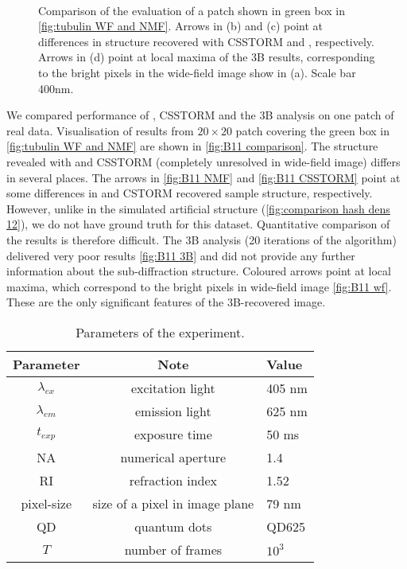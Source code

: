 \begin{figure}[!h]
	\centering
	\newcommand{\sizef}{.95}
	\newcommand{\wf}{.45\textwidth}
	\\
	\caption{Comparison of the evaluation of a patch shown in green box in \autoref{fig:tubulin WF and NMF}. Arrows in (b) and (c) point at differences in structure recovered with CSSTORM and \inmf{}, respectively. Arrows in (d) point at local maxima of the 3B results, corresponding to the bright pixels in the wide-field image show in (a). Scale bar 400\unit{nm}.}
	\label{fig:B11 comparison}
\end{figure}

We compared performance of \inmf{}, CSSTORM and the 3B analysis on one patch of real data. Visualisation of results from $20\times20$ patch covering the green box in \autoref{fig:tubulin WF and NMF} are shown in \autoref{fig:B11 comparison}. The structure revealed with \inmf{} and CSSTORM (completely unresolved in wide-field image) differs in several places. The arrows in \autoref{fig:B11 NMF} and \autoref{fig:B11 CSSTORM}  point at some differences in  \inmf{} and CSTORM recovered sample structure, respectively. However, unlike in the simulated artificial structure (\autoref{fig:comparison hash dens 12}), we do not have ground truth for this dataset. Quantitative comparison of the results is therefore difficult. The 3B analysis (20 iterations of the algorithm) delivered very poor results \autoref{fig:B11 3B} and did not provide any further information about the sub-diffraction structure. Coloured arrows point at local maxima, which correspond to the bright pixels in wide-field image \autoref{fig:B11 wf}. These are the only significant features of the 3B-recovered image.

\begin{table}[!h]	
	\centering
	\begin{tabular}{|c|c|l|}
		\hline 
		\bf Parameter & \bf Note  & \bf Value\tabularnewline
		\hline
		$\lambda_{ex}$ & excitation light & 405 nm\tabularnewline
		$\lambda_{em}$ & emission light & 625 nm\tabularnewline
		$t_{exp}$ & exposure time  & 50 ms\tabularnewline
		NA & numerical aperture & 1.4\tabularnewline
		RI & refraction index & 1.52\tabularnewline
		pixel-size & size of a pixel in image plane & 79 nm\tabularnewline
		QD & quantum dots  & QD625\tabularnewline
		$T$ & number of frames  & $10^{3}$\tabularnewline
		\hline
	\end{tabular}
	\caption{Parameters of the experiment.}\label{tab:Parameters of the (a) simulations (b) real data}
	\label{tab:parameters experiment}
\end{table}

